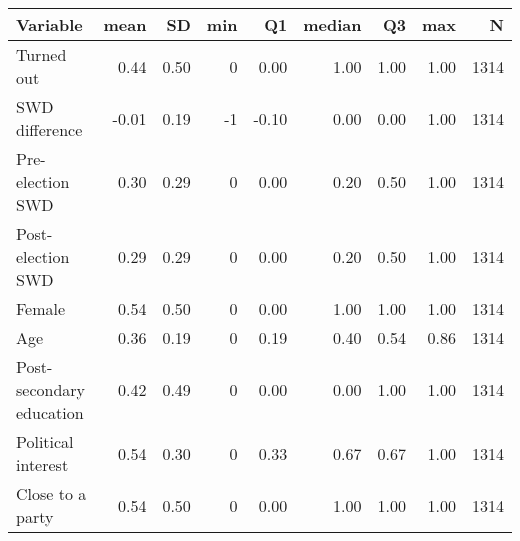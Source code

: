 
\begin{tabular}{l|r|r|r|r|r|r|r|r}
\hline
Variable & mean & SD & min & Q1 & median & Q3 & max & N\\
\hline
Turned out & 0.44 & 0.50 & 0 & 0.00 & 1.00 & 1.00 & 1.00 & 1314\\
\hline
SWD difference & -0.01 & 0.19 & -1 & -0.10 & 0.00 & 0.00 & 1.00 & 1314\\
\hline
Pre-election SWD & 0.30 & 0.29 & 0 & 0.00 & 0.20 & 0.50 & 1.00 & 1314\\
\hline
Post-election SWD & 0.29 & 0.29 & 0 & 0.00 & 0.20 & 0.50 & 1.00 & 1314\\
\hline
Female & 0.54 & 0.50 & 0 & 0.00 & 1.00 & 1.00 & 1.00 & 1314\\
\hline
Age & 0.36 & 0.19 & 0 & 0.19 & 0.40 & 0.54 & 0.86 & 1314\\
\hline
Post-secondary education & 0.42 & 0.49 & 0 & 0.00 & 0.00 & 1.00 & 1.00 & 1314\\
\hline
Political interest & 0.54 & 0.30 & 0 & 0.33 & 0.67 & 0.67 & 1.00 & 1314\\
\hline
Close to a party & 0.54 & 0.50 & 0 & 0.00 & 1.00 & 1.00 & 1.00 & 1314\\
\hline
\end{tabular}
